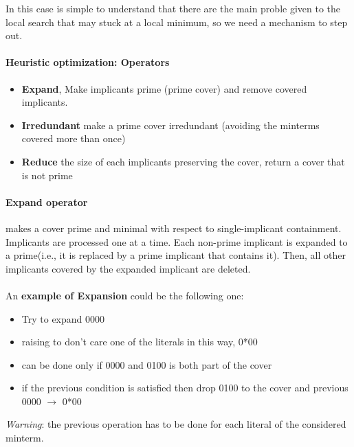 In this case is simple to understand that there are the main proble given to the local search that may stuck at a local minimum, so we need a mechanism to step out.\\

\paragraph{Heuristic optimization: Operators}

\begin{itemize}
	\item \textbf{Expand}, Make implicants prime (prime cover) and remove covered implicants.
	\item \textbf{Irredundant} make a prime cover irredundant (avoiding the minterms covered more than once)
	\item \textbf{Reduce} the size of each implicants preserving the cover, return a cover that is not prime
\end{itemize}

\paragraph{Expand operator}  makes a cover prime and minimal with respect to single-implicant containment. Implicants are processed one at a time. Each non-prime implicant is expanded to a prime(i.e., it is replaced by a prime implicant that contains it). Then, all other implicants covered by the expanded implicant are deleted.\\
\bigskip\\


An \textbf{example of Expansion} could be the following one:
\begin{itemize}
	\item Try to expand 0000
	\item raising to don't care one of the literals in this way, 0*00
	\item can be done only if 0000 and 0100 is both part of the cover
	\item if the previous condition is satisfied then drop 0100 to the cover and previous 0000 $ \rightarrow $ 0*00
\end{itemize}

\textit{Warning}: the previous operation has to be done for each literal of the considered minterm.

